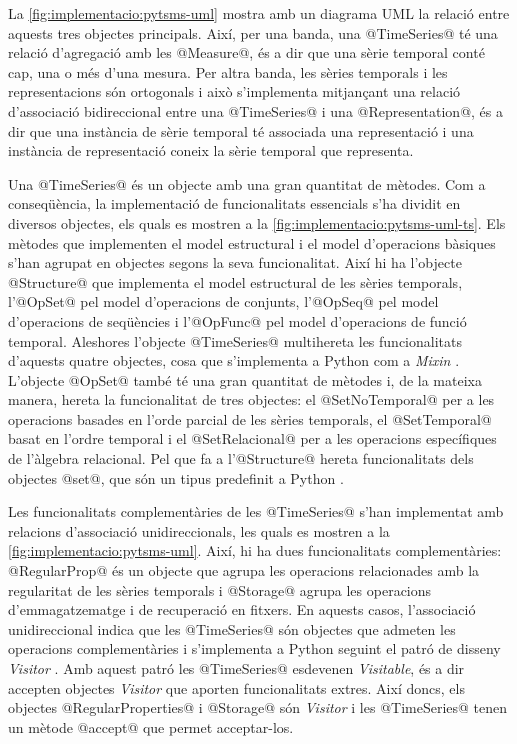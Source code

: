 La \autoref{fig:implementacio:pytsms-uml} mostra amb un diagrama
\gls{UML} la relació entre aquests tres objectes principals. Així, per una
banda, una @TimeSeries@ té una relació d'agregació amb les
@Measure@, és a dir que una sèrie temporal conté cap, una o més
d'una mesura.  Per altra banda, les sèries temporals i les
representacions són ortogonals i això s'implementa mitjançant una
relació d'associació bidireccional entre una @TimeSeries@ i una
@Representation@, és a dir que una instància de sèrie temporal té
associada una representació i una instància de representació coneix la
sèrie temporal que representa.




Una @TimeSeries@ és un objecte amb una gran quantitat de
mètodes. Com a conseqüència, la implementació de funcionalitats
essencials s'ha dividit en diversos objectes, els quals es mostren a
la \autoref{fig:implementacio:pytsms-uml-ts}. Els mètodes que
implementen el model estructural i el model d'operacions bàsiques
s'han agrupat en objectes segons la seva funcionalitat. Així hi ha
l'objecte @Structure@ que implementa el model estructural de les
sèries temporals, l'@OpSet@ pel model d'operacions de conjunts,
l'@OpSeq@ pel model d'operacions de seqüències i l'@OpFunc@
pel model d'operacions de funció temporal.  Aleshores l'objecte
@TimeSeries@ multihereta les funcionalitats d'aquests quatre
objectes, cosa que s'implementa a Python com a
\emph{Mixin} \parencite[\S 8.3.6, \S 20.17]{python:doc2}.  L'objecte
@OpSet@ també té una gran quantitat de mètodes i, de la mateixa
manera, hereta la funcionalitat de tres objectes: el
@SetNoTemporal@ per a les operacions basades en l'orde parcial de
les sèries temporals, el @SetTemporal@ basat en l'ordre temporal
i el @SetRelacional@ per a les operacions específiques de
l'àlgebra relacional. Pel que fa a l'@Structure@ hereta
funcionalitats dels objectes @set@, que són un tipus predefinit a
Python \parencite[\S 5.7]{python:doc2}.


Les funcionalitats complementàries de les @TimeSeries@ s'han
implementat amb relacions d'associació unidireccionals, les quals es
mostren a la \autoref{fig:implementacio:pytsms-uml}. Així, hi ha dues
funcionalitats complementàries: @RegularProp@ és un objecte que agrupa
les operacions relacionades amb la regularitat de les sèries temporals
i @Storage@ agrupa les operacions d'emmagatzematge i de recuperació en
fitxers. En aquests casos, l'associació unidireccional indica que les
@TimeSeries@ són objectes que admeten les operacions complementàries i
s'implementa a Python seguint el patró de disseny
\emph{Visitor} \parencite{ziade08:expert_python_programming:visitor,martin02:visitor}. Amb
aquest patró les @TimeSeries@ esdevenen \emph{Visitable}, és a dir
accepten objectes \emph{Visitor} que aporten funcionalitats
extres. Així doncs, els objectes @RegularProperties@ i @Storage@ són
\emph{Visitor} i les @TimeSeries@ tenen un mètode @accept@ que permet
acceptar-los.


